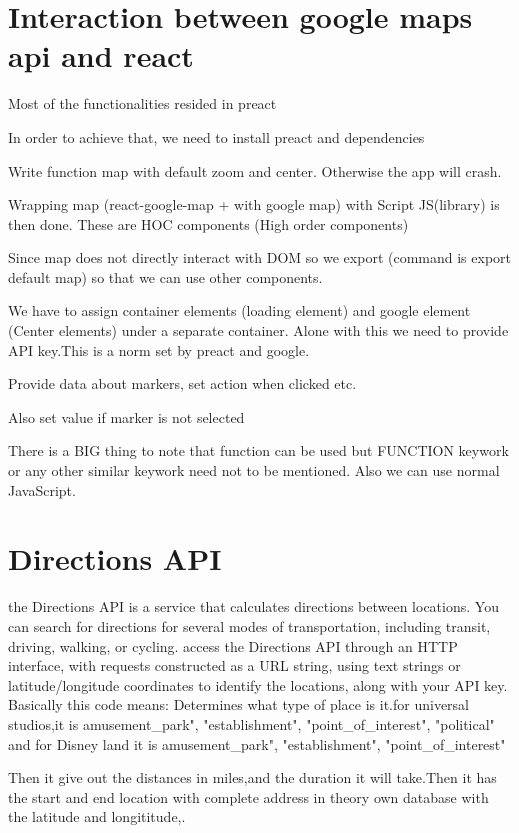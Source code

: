 \documentclass{article}
\begin{document}
\section{Interaction between google maps api and react}
\item Most of the functionalities resided in preact
\item In order to achieve that, we need to install preact and dependencies
\item Write function map with default zoom and center. Otherwise the app will crash.
\item Wrapping map (react-google-map + with google map) with Script JS(library) is then done. These are HOC components (High order components)
\item Since map does not directly interact with DOM so we export (command is export default map) so that we can use other components.
\item We have to assign container elements (loading element) and google element (Center elements) under a separate container. Alone with this we need to provide API key.This is a norm set by preact and google.
\item Provide data about markers, set action when clicked etc.
\item Also set value if marker is not selected
\item There is a BIG thing to note that function can be used but FUNCTION keywork or any other similar keywork need not to be mentioned. Also we can use normal JavaScript.
\section{Directions API}
the Directions API is a service that calculates directions between locations. You can search for directions for several modes of transportation, including transit, driving, walking, or cycling.
access the Directions API through an HTTP interface, with requests constructed as a URL string, using text strings or latitude/longitude coordinates to identify the locations, along with your API key.
Basically this code means:
Determines what type of place is it.for universal studios,it is amusement_park", "establishment", "point_of_interest", "political" and for Disney land it is amusement_park", "establishment", "point_of_interest"

Then it give out the distances in miles,and the duration it will take.Then it has the start and end location with complete address in theory own database with the latitude and longititude,.
\end{document}
